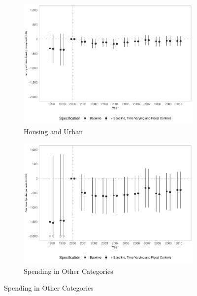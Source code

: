 \begin{figure}[h!]
\begin{center}
\begin{subfigure}{0.48\textwidth}
        \caption{\scriptsize Housing and Urban}\label{fig:8e}
        \includegraphics[width=\textwidth]{plots/finbra_desp_hab_urb_pcapita_dist_ec29_baseline_dist_ec29_baseline_8.pdf}
    \end{subfigure}
    \begin{subfigure}{0.48\textwidth}
        \centering
        \caption{\scriptsize Spending in Other Categories}\label{fig:8f}
        \includegraphics[width=\textwidth]{plots/finbra_desp_outros_area_pcapita_dist_ec29_baseline_dist_ec29_baseline_8.pdf}
    \end{subfigure}
    
    \end{center}
    
\end{figure}